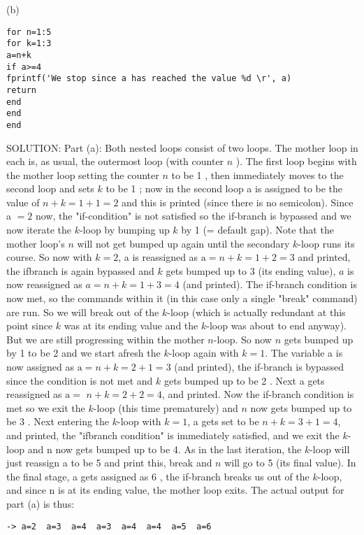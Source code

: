 \documentclass[../main.tex]{subfiles}
\begin{document}
(b) 
\begin{verbatim}
for n=1:5
for k=1:3 
a=n+k
if a>=4
fprintf('We stop since a has reached the value %d \r', a)
return
end
end
end 
\end{verbatim}

SOLUTION: Part (a): Both nested loops consist of two loops. The mother loop in each is, as usual, the outermost loop (with counter $n$ ). The first loop begins with the mother loop setting the counter $n$ to be 1 , then immediately moves to the second loop and sets $k$ to be 1 ; now in the second loop a is assigned to be the value of $n+k=1+1=2$ and this is printed (since there is no semicolon). Since a $=2$ now, the "if-condition" is not satisfied so the if-branch is bypassed and we now iterate the $k$-loop by bumping up $k$ by 1 (= default gap). Note that the mother loop's $n$ will not get bumped up again until the secondary $k$-loop runs its course. So now with $k=2$, a is reassigned as $\mathrm{a}=n+k=1+2=3$ and printed, the ifbranch is again bypassed and $k$ gets bumped up to 3 (its ending value), $a$ is now reassigned as $a=n+k=1+3=4$ (and printed). The if-branch condition is now met, so the commands within it (in this case only a single "break" command) are run. So we will break out of the $k$-loop (which is actually redundant at this point since $k$ was at its ending value and the $k$-loop was about to end anyway). But we are still progressing within the mother $n$-loop. So now $n$ gets bumped up by 1 to be 2 and we start afresh the $k$-loop again with $k=1$. The variable a is now assigned as $\mathrm{a}=n+k=2+1=3$ (and printed), the if-branch is bypassed since the condition is not met and $k$ gets bumped up to be 2 . Next a gets reassigned as $\mathrm{a}=$ $n+k=2+2=4$, and printed. Now the if-branch condition is met so we exit the $k$-loop (this time prematurely) and $n$ now gets bumped up to be 3 . Next entering the $k$-loop with $k=1$, a gets set to be $n+k=3+1=4$, and printed, the "ifbranch condition" is immediately satisfied, and we exit the $k$-loop and n now gets bumped up to be 4. As in the last iteration, the $k$-loop will just reassign a to be 5 and print this, break and $n$ will go to 5 (its final value). In the final stage, a gets assigned as 6 , the if-branch breaks us out of the $k$-loop, and since $\mathrm{n}$ is at its ending value, the mother loop exits.
The actual output for part (a) is thus:

\begin{verbatim}-> a=2  a=3  a=4  a=3  a=4  a=4  a=5  a=6\end{verbatim}
\end{document}

